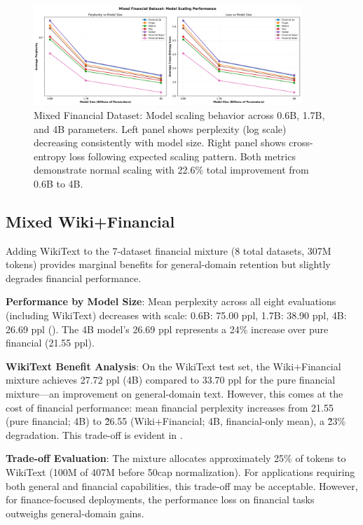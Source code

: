 \begin{figure}[h]
\centering
\includegraphics[width=0.9\textwidth]{figures/scaling_mixed_financial.png}
\caption[Mixed Financial Dataset: Scaling Behavior]{Mixed Financial Dataset: Model scaling behavior across 0.6B, 1.7B, and 4B parameters. Left panel shows perplexity (log scale) decreasing consistently with model size. Right panel shows cross-entropy loss following expected scaling pattern. Both metrics demonstrate normal scaling with 22.6\% total improvement from 0.6B to 4B.}
\label{fig:scaling_mixed_financial}
\end{figure}



\subsection{Mixed Wiki+Financial}

Adding WikiText to the 7-dataset financial mixture (8 total datasets, 307M tokens) provides marginal benefits for general-domain retention but slightly degrades financial performance.

\textbf{Performance by Model Size}: Mean perplexity across all eight evaluations (including WikiText) decreases with scale: 0.6B: 75.00 ppl, 1.7B: 38.90 ppl, 4B: 26.69 ppl (). The 4B model's 26.69 ppl represents a 24\% increase over pure financial (21.55 ppl).

\textbf{WikiText Benefit Analysis}: On the WikiText test set, the Wiki+Financial mixture achieves 27.72 ppl (4B) compared to 33.70 ppl for the pure financial mixture—an improvement on general-domain text. However, this comes at the cost of financial performance: mean financial perplexity increases from 21.55 (pure financial; 4B) to \~26.55 (Wiki+Financial; 4B, financial-only mean), a \~23\% degradation. This trade-off is evident in .

\textbf{Trade-off Evaluation}: The mixture allocates approximately 25\% of tokens to WikiText (100M of 407M before 50cap normalization). For applications requiring both general and financial capabilities, this trade-off may be acceptable. However, for finance-focused deployments, the performance loss on financial tasks outweighs general-domain gains.

